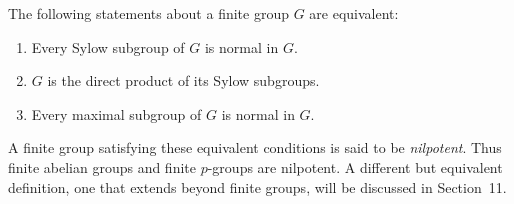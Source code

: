 \documentclass[../Odyssey_Project.tex]{subfiles}
\begin{document}
\begin{theorem}
\label{thm:8.7}
The following statements about a finite group $G$ are equivalent:
\begin{enumerate}
    \item[(1)] Every Sylow subgroup of $G$ is normal in $G$.
    \item[(2)] $G$ is the direct product of its Sylow subgroups.
    \item[(3)] Every maximal subgroup of $G$ is normal in $G$.
\end{enumerate}
\end{theorem}
A finite group satisfying these equivalent conditions is said to be \emph{nilpotent}. Thus finite abelian groups and finite $p$-groups are nilpotent. A different but equivalent definition, one that extends beyond finite groups, will be discussed in Section~11.
\end{document}
